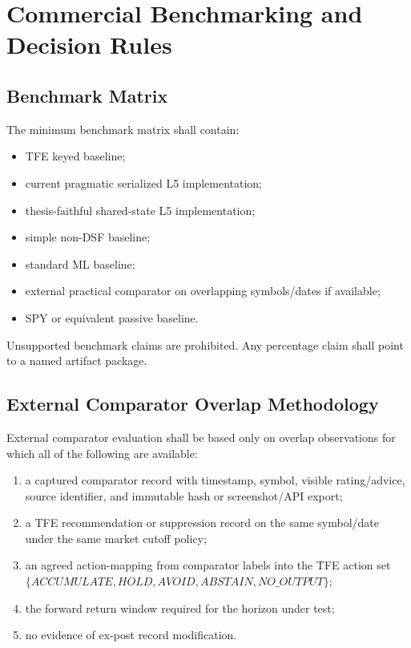 \chapter{Commercial Benchmarking and Decision Rules}
\section{Benchmark Matrix}

The minimum benchmark matrix shall contain:
\begin{itemize}
    \item TFE keyed baseline;
    \item current pragmatic serialized L5 implementation;
    \item thesis-faithful shared-state L5 implementation;
    \item simple non-DSF baseline;
    \item standard ML baseline;
    \item external practical comparator on overlapping symbols/dates if available;
    \item SPY or equivalent passive baseline.
\end{itemize}
Unsupported benchmark claims are prohibited. Any percentage claim shall point to a named artifact package.

\section{External Comparator Overlap Methodology}

External comparator evaluation shall be based only on overlap observations for which all of the following are available:
\begin{enumerate}[leftmargin=1.2cm]
    \item a captured comparator record with timestamp, symbol, visible rating/advice, source identifier, and immutable hash or screenshot/API export;
    \item a TFE recommendation or suppression record on the same symbol/date under the same market cutoff policy;
    \item an agreed action-mapping from comparator labels into the TFE action set $\{ACCUMULATE,HOLD,AVOID,ABSTAIN,NO\_OUTPUT\}$;
    \item the forward return window required for the horizon under test;
    \item no evidence of ex-post record modification.
\end{enumerate}

